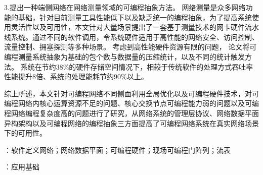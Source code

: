 3.提出一种端侧网络在网络测量领域的可编程抽象方法。
网络测量是众多网络功能的基础，针对目前测量工具性能低下以及缺乏统一的编程抽象，为了提高系统使用灵活性以及可用性，本文针对大量场景提出了一套基于测量技术的网卡硬件流水线系统。通过不同的软件调用，令系统硬件适用于高性能的网络安全、访问控制、流量控制、拥塞探测等多种场景。
考虑到高性能硬件资源有限的问题，
论文将可编程测量系统抽象为基础的包个数与数据量的压缩统计，以及不同的统计触发方法。
系统在节约38\%的硬件存储空间情况下，相较于传统软件的处理方式吞吐率性能提升8倍、系统的处理能耗节约90\%以上。

综上所述，本文针对可编程网络不同侧面利用全局优化以及可编程硬件技术，对可编程网络内核心运算资源不足的问题、核心交换节点可编程能力弱的问题以及可编程网络编程复杂度高的问题进行了研究，从网络系统的管理层协议、网络数据平面异构架构以及可编程网络的编程抽象三方面提高了可编程网络系统在真实网络场景下的可用性。



{\boldsong}
\vspace{\baselineskip}
：软件定义网络；网络数据平面；可编程硬件；现场可编程门阵列；流表

\vspace{\baselineskip}
：应用基础


\clearpage


